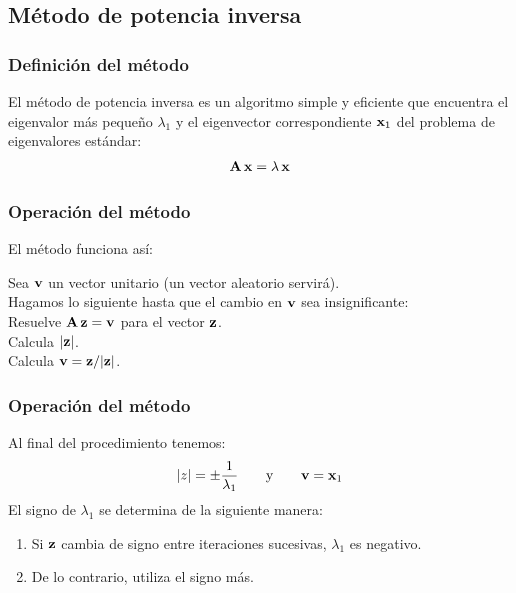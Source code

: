 \documentclass[12pt]{beamer}
\begin{document}
\subsection{Método de potencia inversa}

\begin{frame}
\frametitle{Definición del método}
El método de potencia inversa es un algoritmo simple y eficiente que encuentra el eigenvalor más pequeño $\lambda_{1}$ y el eigenvector correspondiente $\vb{x}_{1}$ del problema de eigenvalores estándar:
\pause
\begin{align}
\vb{A \, x} = \lambda \, \vb{x}
\label{eq:ecuacion_09_27}
\end{align}
\end{frame}
\begin{frame}
\frametitle{Operación del método}
El método funciona así:
\pause
\begin{tcolorbox}[colback=bisque, title=Resumen del procedimiento]
Sea $\vb{v}$ un vector unitario (un vector aleatorio servirá). \\ \pause
Hagamos lo siguiente hasta que el cambio en $\vb{v}$ sea insignificante: \\ \pause
Resuelve $\vb{A \, z} = \vb{v}$ para el vector $\vb{z}$. \\ \pause
Calcula $\abs{\vb{z}}$. \\ \pause 
Calcula $\vb{v} = \vb{z} / \abs{\vb{z}}$.
\end{tcolorbox}
\end{frame}
\begin{frame}
\frametitle{Operación del método}
Al final del procedimiento tenemos:
\pause
\begin{align*}
\abs{z} = \pm \dfrac{1}{\lambda_{1}} \hspace{0.7cm} \text{y} \hspace{0.7cm} \vb{v} = \vb{x}_{1}
\end{align*}
\pause
El signo de $\lambda_{1}$ se determina de la siguiente manera:
\pause
{}
\begin{enumerate}[<+->]
\item Si $\vb{z}$ cambia de signo entre iteraciones sucesivas, $\lambda_{1}$ es negativo.
\item De lo contrario, utiliza el signo más.
\end{enumerate}
\end{frame}
\end{document}
